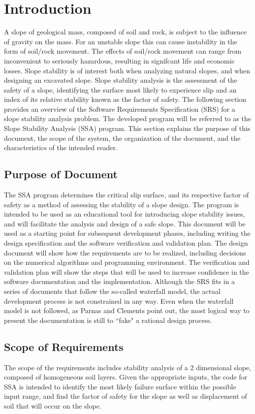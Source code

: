 \documentclass[12pt]{article}
\begin{document}
\section{Introduction}
\label{Sec:Intro}
A slope of geological mass, composed of soil and rock, is subject to the influence of gravity on the mass. For an unstable slope this can cause instability in the form of soil/rock movement. The effects of soil/rock movement can range from inconvenient to seriously hazardous, resulting in signifcant life and economic losses. Slope stability is of interest both when analyzing natural slopes, and when designing an excavated slope. Slope stability analysis is the assessment of the safety of a slope, identifying the surface most likely to experience slip and an index of its relative stability known as the factor of safety.
The following section provides an overview of the Software Requirements Specification (SRS) for a slope stability analysis problem. The developed program will be referred to as the Slope Stability Analysis (SSA) program. This section explains the purpose of this document, the scope of the system, the organization of the document, and the characteristics of the intended reader.
\subsection{Purpose of Document}
\label{Sec:DocPurpose}
The SSA program determines the critical slip surface, and its respective factor of safety as a method of assessing the stability of a slope design. The program is intended to be used as an educational tool for introducing slope stability issues, and will facilitate the analysis and design of a safe slope.
This document will be used as a starting point for subsequent development phases, including writing the design specification and the software verification and validation plan. The design document will show how the requirements are to be realized, including decisions on the numerical algorithms and programming environment. The verification and validation plan will show the steps that will be used to increase confidence in the software documentation and the implementation. Although the SRS fits in a series of documents that follow the so-called waterfall model, the actual development process is not constrained in any way. Even when the waterfall model is not followed, as Parnas and Clements point out, the most logical way to present the documentation is still to ``fake" a rational design process.
\subsection{Scope of Requirements}
\label{Sec:ReqsScope}
The scope of the requirements includes stability analysis of a 2 dimensional slope, composed of homogeneous soil layers. Given the appropriate inputs, the code for SSA is intended to identify the most likely failure surface within the possible input range, and find the factor of safety for the slope as well as displacement of soil that will occur on the slope.
\end{document}
